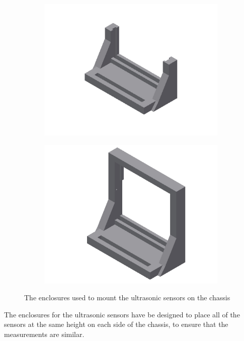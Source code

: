 \begin{figure}[H]
	\centering
	\begin{subfigure}[H]{0.4\textwidth}
		\includegraphics[width=\textwidth]{images/ultrasonicholder.jpg}
	\end{subfigure}%
	\quad
	\begin{subfigure}[H]{0.4\textwidth}
		\includegraphics[width=\textwidth]{images/ultrasonicholder-upsidedown.jpg}
	\end{subfigure}
	\caption{The enclosures used to mount the ultrasonic sensors on the chassis}
\end{figure}

The enclosures for the ultrasonic sensors have be designed to place all of the sensors at the same height on each side of the chassis, to ensure that the measurements are similar.

